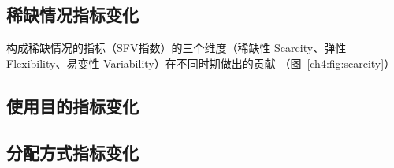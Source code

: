 \subsection{稀缺情况指标变化}

构成稀缺情况的指标（SFV指数）的三个维度（稀缺性 Scarcity、弹性 Flexibility、易变性 Variability）在不同时期做出的贡献
（图~\ref{ch4:fig:scarcity}）

\subsection{使用目的指标变化}

\subsection{分配方式指标变化}
